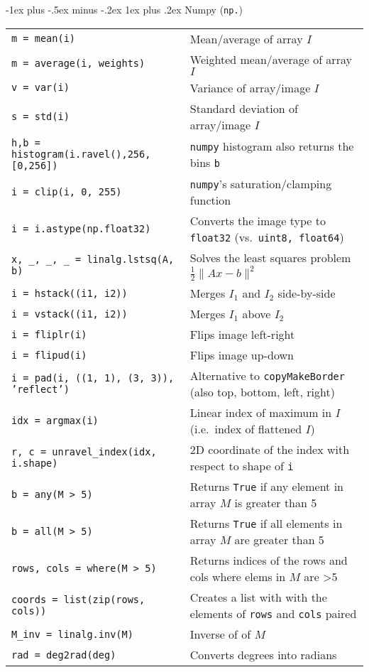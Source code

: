 \documentclass[10pt,landscape, a4paper]{article}
\makeatletter
\renewcommand{\subsubsection}{\@startsection{subsubsection}{3}{0mm}%
                                {-1ex plus -.5ex minus -.2ex}%
                                {1ex plus .2ex}%
                                {\normalfont\small\bfseries}}
\makeatother
\begin{document}
\begin{multicols}{2}
\subsubsection{Numpy (\texttt{np.})}
\begin{tabular}{@{}ll@{}}
\texttt{m = mean(i)} & Mean/average of array $I$\\
\texttt{m = average(i, weights)} & Weighted mean/average of array $I$\\
\texttt{v = var(i)} & Variance of array/image $I$\\
\texttt{s = std(i)} & Standard deviation of array/image $I$\\
\texttt{h,b = histogram(i.ravel(),256,[0,256])} & \texttt{numpy} histogram also returns the bins \texttt{b}\\
\texttt{i = clip(i, 0, 255)} & \texttt{numpy}'s saturation/clamping function\\
\texttt{i = i.astype(np.float32)} & Converts the image type to \texttt{float32} (vs.\ \texttt{uint8, float64})\\
\texttt{x, _, _, _ = linalg.lstsq(A, b)} & Solves the least squares problem $\frac{1}{2}\lVert Ax - b\rVert^2$\\
\texttt{i = hstack((i1, i2))} & Merges $I_1$ and $I_2$ side-by-side\\
\texttt{i = vstack((i1, i2))} & Merges $I_1$ above $I_2$ \\
\texttt{i = fliplr(i)} & Flips image left-right\\
\texttt{i = flipud(i)} & Flips image up-down\\
\texttt{i = pad(i, ((1, 1), (3, 3)), 'reflect')} & Alternative to \texttt{copyMakeBorder} (also top, bottom, left, right)\\
\texttt{idx = argmax(i)} & Linear index of maximum in $I$ (i.e.\ index of flattened $I$)\\
\texttt{r, c = unravel_index(idx, i.shape)} & 2D coordinate of the index with respect to shape of \texttt{i}\\
\texttt{b = any(M > 5)} & Returns \texttt{True} if any element in array $M$ is greater than 5\\
\texttt{b = all(M > 5)} & Returns \texttt{True} if all elements in array $M$ are greater than 5\\
\texttt{rows, cols = where(M > 5)} & Returns indices of the rows and cols where elems in $M$ are >5\\
\texttt{coords = list(zip(rows, cols))} & Creates a list with with the elements of \texttt{rows} and \texttt{cols} paired\\
\texttt{M_inv = linalg.inv(M)} & Inverse of of $M$\\
\texttt{rad = deg2rad(deg)} & Converts degrees into radians\\
\end{tabular}

\end{multicols}
\end{document}
